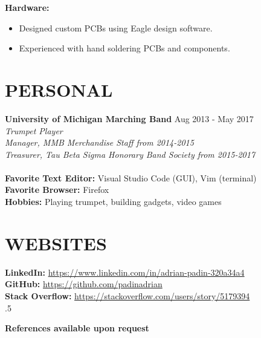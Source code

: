\documentclass[margin,11pt]{res}
\begin{document}
\begin{resume}
\vspace{-10pt}
\textbf{Hardware:}
\begin{itemize}
	\itemsep -2pt
    \item Designed custom PCBs using Eagle design software.
    \item Experienced with hand soldering PCBs and components.
\end{itemize}

\vspace{-10pt}
\section{PERSONAL}
\textbf{University of Michigan Marching Band} \hfill Aug 2013 - May 2017\\
\textsl{Trumpet Player}\\
\textsl{Manager, MMB Merchandise Staff from 2014-2015}\\
\textsl{Treasurer, Tau Beta Sigma Honorary Band Society from 2015-2017}\\
\\
\textbf{Favorite Text Editor:} Visual Studio Code (GUI), Vim (terminal)\\
\textbf{Favorite Browser:} Firefox\\
\textbf{Hobbies:} Playing trumpet, building gadgets, video games

\section{WEBSITES}
\textbf{LinkedIn:}
\href{https://www.linkedin.com/in/adrian-padin-320a34a4}{https://www.linkedin.com/in/adrian-padin-320a34a4}\\
\textbf{GitHub:}
\href{https://github.com/padinadrian}{https://github.com/padinadrian}\\
\textbf{Stack Overflow:}
\href{https://stackoverflow.com/users/story/5179394}{https://stackoverflow.com/users/story/5179394}\\


\vspace{10pt}
\moveleft.5\hoffset\centerline{\large\bf References available upon request}

\end{resume}
\end{document}
